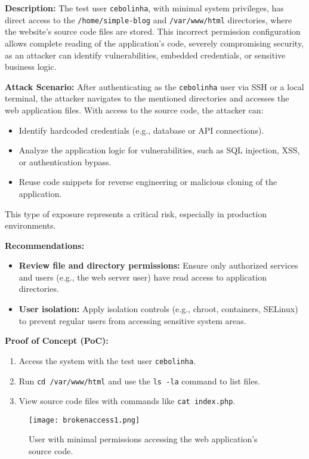 \documentclass[a4paper,12pt]{article}
\begin{document}
\textbf{Description:}  
The test user \texttt{cebolinha}, with minimal system privileges, has direct access to the \texttt{/home/simple-blog} and \texttt{/var/www/html} directories, where the website's source code files are stored. This incorrect permission configuration allows complete reading of the application's code, severely compromising security, as an attacker can identify vulnerabilities, embedded credentials, or sensitive business logic.

\textbf{Attack Scenario:}  
After authenticating as the \texttt{cebolinha} user via SSH or a local terminal, the attacker navigates to the mentioned directories and accesses the web application files. With access to the source code, the attacker can:  
\begin{itemize}
    \item Identify hardcoded credentials (e.g., database or API connections).  
    \item Analyze the application logic for vulnerabilities, such as SQL injection, XSS, or authentication bypass.  
    \item Reuse code snippets for reverse engineering or malicious cloning of the application.  
\end{itemize}
This type of exposure represents a critical risk, especially in production environments.

\textbf{Recommendations:}  
\begin{itemize}
    \item \textbf{Review file and directory permissions:} Ensure only authorized services and users (e.g., the web server user) have read access to application directories.  
    \item \textbf{User isolation:} Apply isolation controls (e.g., chroot, containers, SELinux) to prevent regular users from accessing sensitive system areas.  
\end{itemize}

\textbf{Proof of Concept (PoC):}  
\begin{enumerate}
    \item Access the system with the test user \texttt{cebolinha}.  
    \item Run \texttt{cd /var/www/html} and use the \texttt{ls -la} command to list files.  
    \item View source code files with commands like \texttt{cat index.php}.  
\end{enumerate}

\begin{figure}[H]
    \centering
    \texttt{[image: brokenaccess1.png]}
    \caption{User with minimal permissions accessing the web application's source code.}
\end{figure}
\end{document}
